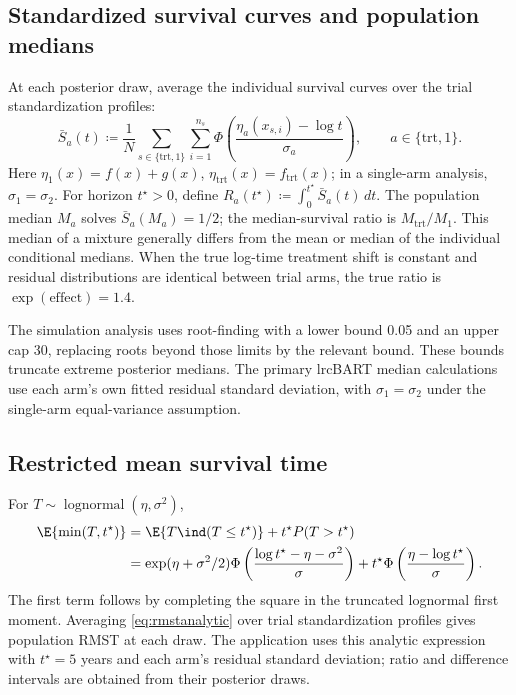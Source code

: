 \subsection{Standardized survival curves and population medians}\label{sec:D.3}
At each posterior draw, average the individual survival curves over the trial standardization profiles:
\begin{equation}
\bar S_a(t)\coloneqq \frac1N\sum_{s\in\{\mathrm{trt},1\}}\sum_{i=1}^{n_s}\Phi\left(\frac{\eta_a(x_{s,i})-\log t}{\sigma_a}\right),\qquad a\in\{\mathrm{trt},1\}.
\end{equation}
Here $\eta_{1}(x)=f(x)+g(x)$, $\eta_{\mathrm{trt}}(x)=f_{\mathrm{trt}}(x)$; in a single-arm analysis, $\sigma_{1}=\sigma_{2}$. For horizon $t^\star>0$, define $R_a(t^\star)\coloneqq\int_0^{t^\star}\bar S_a(t)\,dt$. The population median $M_a$ solves $\bar S_a(M_a)=1/2$; the median-survival ratio is $M_{\mathrm{trt}}/M_{1}$. This median of a mixture generally differs from the mean or median of the individual conditional medians. When the true log-time treatment shift is constant and residual distributions are identical between trial arms, the true ratio is $\exp(\mathrm{effect})=1.4$.

The simulation analysis uses root-finding with a lower bound 0.05 and an upper cap 30, replacing roots beyond those limits by the relevant bound. These bounds truncate extreme posterior medians. The primary lrcBART median calculations use each arm's own fitted residual standard deviation, with $\sigma_{1}=\sigma_{2}$ under the single-arm equal-variance assumption.

\subsection{Restricted mean survival time}\label{sec:D.4}
For $T\sim\operatorname{lognormal}(\eta,\sigma^2)$,
\begin{equation}\label{eq:rmstanalytic}
\begin{aligned}
\E\{\min(T,t^\star)\}
&=\E\{T\ind(T\leq t^\star)\}+t^\star P(T>t^\star)\\
&=\exp(\eta+\sigma^2/2)\Phi\left(\frac{\log t^\star-\eta-\sigma^2}{\sigma}\right)
+t^\star\Phi\left(\frac{\eta-\log t^\star}{\sigma}\right).
\end{aligned}
\end{equation}
The first term follows by completing the square in the truncated lognormal first moment. Averaging \eqref{eq:rmstanalytic} over trial standardization profiles gives population RMST at each draw. The application uses this analytic expression with $t^\star=5$ years and each arm's residual standard deviation; ratio and difference intervals are obtained from their posterior draws.

